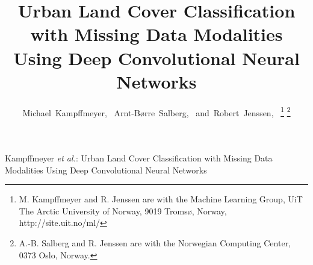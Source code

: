 \documentclass[journal]{IEEEtran}
\begin{document}
%
\title{Urban Land Cover Classification with Missing Data Modalities Using Deep Convolutional Neural Networks}

\author{Michael~Kampffmeyer,~
        Arnt-B{\o}rre~Salberg,~
        and~Robert~Jenssen,~%
\thanks{M. Kampffmeyer and R. Jenssen are with the Machine Learning Group, UiT The Arctic University of Norway, 9019 Troms{\o}, Norway, http://site.uit.no/ml/}%
\thanks{A.-B. Salberg and R. Jenssen are with the Norwegian Computing Center, 0373 Oslo, Norway.}%
}

\markboth{}%
{Kampffmeyer \MakeLowercase{\textit{et al.}}: Urban Land Cover Classification with Missing Data Modalities Using Deep Convolutional Neural Networks}
%

\maketitle
\end{document}
